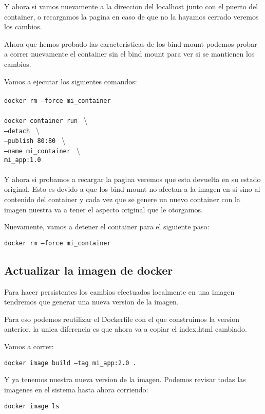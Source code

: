 \documentclass[11pt]{article} %
\begin{document}
Y ahora si vamos nuevamente a la direccion del localhost junto con el puerto del container, o recargamos la pagina en caso de que no la hayamos cerrado veremos los cambios.

Ahora que hemos probado las caracteristicas de los bind mount podemos probar a correr nuevamente el container sin el bind mount para ver si se mantienen los cambios.

Vamos a ejecutar los siguientes comandos: \\ \\
	\texttt{docker rm --force mi\_container} \\ \\
	\texttt{docker container run } \textbackslash \\
	\texttt{--detach } \textbackslash \\
	\texttt{--publish 80:80 } \textbackslash \\
	\texttt{--name mi\_container } \textbackslash \\
	\texttt{mi\_app:1.0} \\ \\

Y ahora si probamos a recargar la pagina veremos que esta devuelta en su estado original. Esto es devido a que los bind mount no afectan a la imagen en si sino al contenido del container y cada vez que se genere un nuevo container con la imagen nuestra va a tener el aspecto original que le otorgamos.

Nuevamente, vamos a detener el container para el siguiente paso:
\begin{center}
	\texttt{docker rm --force mi\_container}
\end{center}

\subsection{Actualizar la imagen de docker}

Para hacer persistentes los cambios efectuados localmente en una imagen tendremos que generar una nueva version de la imagen.

Para eso podemos reutilizar el Dockerfile con el que construimos la version anterior, la unica diferencia es que ahora va a copiar el index.html cambiado.

Vamos a correr:
\begin{center}
	\texttt{docker image build --tag mi\_app:2.0 .}
\end{center}

Y ya tenemos nuestra nueva version de la imagen. Podemos revisar todas las imagenes en el sistema hasta ahora corriendo:
\begin{center}
	\texttt{docker image ls}
\end{center}
\end{document}
